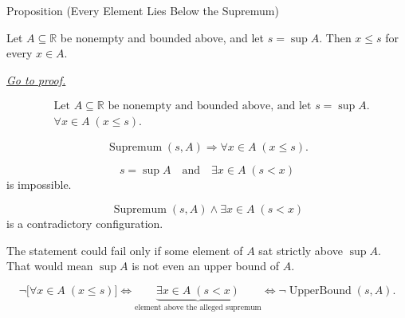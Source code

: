 \begin{propositionbox}{Proposition (Every Element Lies Below the Supremum)}
\begin{proposition}
\label{prop:every-element-lies-below-the-supremum}
Let $A\subseteq\mathbb{R}$ be nonempty and bounded above, and let $s=\sup A$. Then $x\le s$ for every $x\in A$.

\smallskip
\noindent
\hyperref[prf:every-element-lies-below-the-supremum]{\textit{Go to proof.}}
\end{proposition}
\end{propositionbox}

\begin{remark*}
\[
\begin{aligned}
&\text{Let }A\subseteq\mathbb{R}\text{ be nonempty and bounded above, and let }s=\sup A.\\
&\forall x\in A\;(x\le s).
\end{aligned}
\]
\end{remark*}

\begin{remark*}
\[
\operatorname{Supremum}(s,A)
\Longrightarrow
\forall x\in A\;(x\le s).
\]
\end{remark*}

\begin{remark*}
\[
s=\sup A\quad\text{and}\quad \exists x\in A\;(s<x)
\]
is impossible.
\end{remark*}

\begin{remark*}
\[
\operatorname{Supremum}(s,A)\land \exists x\in A\;(s<x)
\]
is a contradictory configuration.
\end{remark*}

\begin{remark*}
The statement could fail only if some element of $A$ sat strictly above $\sup A$. That would mean $\sup A$ is not even an upper bound of $A$.
\end{remark*}

\begin{remark*}
\[
\neg\bigl[\forall x\in A\;(x\le s)\bigr]
\Longleftrightarrow
\underbrace{\exists x\in A\;(s<x)}_{\text{element above the alleged supremum}}
\Longleftrightarrow
\neg\operatorname{UpperBound}(s,A).
\]
\end{remark*}

